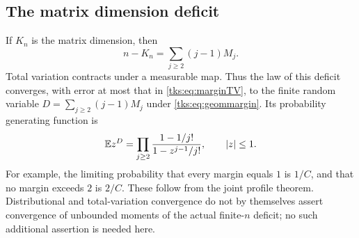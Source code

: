 \subsection{The matrix dimension deficit}
If $K_n$ is the matrix dimension, then
\[
n-K_n=\sum_{j\geq2}(j-1)M_j.
\]
Total variation contracts under a measurable map. Thus the law of this deficit converges, with error at most that in \eqref{tks:eq:marginTV}, to the finite random variable
$D=\sum_{j\geq2}(j-1)M_j$ under \eqref{tks:eq:geommargin}. Its probability generating function is
\begin{equation}\label{tks:eq:deficitpgf}
\mathbb E z^D=\prod_{j\geq2}\frac{1-1/j!}{1-z^{j-1}/j!},\qquad |z|\leq1.
\end{equation}
For example, the limiting probability that every margin equals $1$ is $1/C$, and that no margin exceeds $2$ is $2/C$. These follow from the joint profile theorem. Distributional and total-variation convergence do not by themselves assert convergence of unbounded moments of the actual finite-$n$ deficit; no such additional assertion is needed here.
